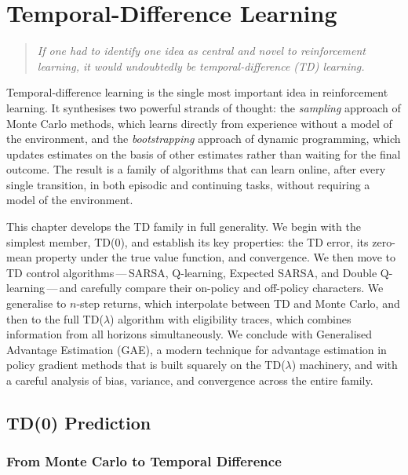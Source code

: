 \chapter{Temporal-Difference Learning}
\label{ch:td}

\begin{quote}
\itshape
If one had to identify one idea as central and novel to reinforcement learning, it would undoubtedly be temporal-difference (TD) learning.
\end{quote}

\bigskip

Temporal-difference learning is the single most important idea in reinforcement learning.  It synthesises two powerful strands of thought: the \emph{sampling} approach of Monte Carlo methods, which learns directly from experience without a model of the environment, and the \emph{bootstrapping} approach of dynamic programming, which updates estimates on the basis of other estimates rather than waiting for the final outcome.  The result is a family of algorithms that can learn online, after every single transition, in both episodic and continuing tasks, without requiring a model of the environment.

This chapter develops the TD family in full generality.  We begin with the simplest member, TD(0), and establish its key properties: the TD error, its zero-mean property under the true value function, and convergence.  We then move to TD control algorithms\,---\,SARSA, Q-learning, Expected SARSA, and Double Q-learning\,---\,and carefully compare their on-policy and off-policy characters.  We generalise to $n$-step returns, which interpolate between TD and Monte Carlo, and then to the full TD($\lambda$) algorithm with eligibility traces, which combines information from all horizons simultaneously.  We conclude with Generalised Advantage Estimation (GAE), a modern technique for advantage estimation in policy gradient methods that is built squarely on the TD($\lambda$) machinery, and with a careful analysis of bias, variance, and convergence across the entire family.

\section{TD(0) Prediction}
\label{sec:td0}

\subsection{From Monte Carlo to Temporal Difference}

